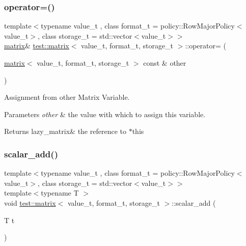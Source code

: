 \subsubsection{\texorpdfstring{operator=()}{operator=()}\hspace{0.1cm}{\footnotesize\ttfamily [2/2]}}
{\footnotesize\ttfamily template$<$typename value\+\_\+t , class format\+\_\+t  = policy\+::\+Row\+Major\+Policy$<$value\+\_\+t$>$, class storage\+\_\+t  = std\+::vector$<$value\+\_\+t$>$$>$ \\
\mbox{\hyperlink{classtest_1_1matrix}{matrix}}\& \mbox{\hyperlink{classtest_1_1matrix}{test\+::matrix}}$<$ value\+\_\+t, format\+\_\+t, storage\+\_\+t $>$\+::operator= (\begin{DoxyParamCaption}\item[{\mbox{\hyperlink{classtest_1_1matrix}{matrix}}$<$ value\+\_\+t, format\+\_\+t, storage\+\_\+t $>$ const \&}]{other }\end{DoxyParamCaption})\hspace{0.3cm}{\ttfamily [inline]}}



Assignment from other Matrix Variable. 


\begin{DoxyParams}{Parameters}
{\em other} & the value with which to assign this variable. \\
\hline
\end{DoxyParams}
\begin{DoxyReturn}{Returns}
lazy\+\_\+matrix\& the reference to $\ast$this 
\end{DoxyReturn}
\mbox{\label{classtest_1_1matrix_a0bb59ea5c15a548758863aa46b291219}} 
\subsubsection{\texorpdfstring{scalar\_add()}{scalar\_add()}}
{\footnotesize\ttfamily template$<$typename value\+\_\+t , class format\+\_\+t  = policy\+::\+Row\+Major\+Policy$<$value\+\_\+t$>$, class storage\+\_\+t  = std\+::vector$<$value\+\_\+t$>$$>$ \\
template$<$typename T $>$ \\
void \mbox{\hyperlink{classtest_1_1matrix}{test\+::matrix}}$<$ value\+\_\+t, format\+\_\+t, storage\+\_\+t $>$\+::scalar\+\_\+add (\begin{DoxyParamCaption}\item[{T}]{t }\end{DoxyParamCaption})\hspace{0.3cm}{\ttfamily [inline]}}



